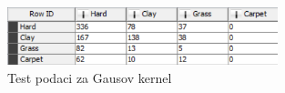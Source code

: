 \documentclass[a4paper]{article}
\begin{document}
\begin{figure}[H]
\begin{center}
	\includegraphics[width=0.7\textwidth]{Klasifikacija/SVM/rbf_test}
\end{center}
\caption{Test podaci za Gausov kernel}
\label{fig:rbf_test}
\end{figure}

\restoregeometry
\end{document}
